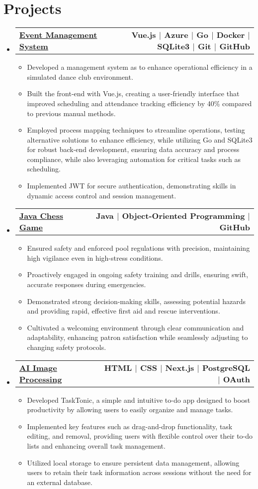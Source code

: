 \documentclass[letterpaper,10pt]{article}
\makeatletter
\newcommand{\resumeItem}[1]{
  \item\small{
    {#1 \vspace{-2pt}}
  }
}
\newcommand{\resumeProjectHeading}[2]{
    \item
    \begin{tabular*}{1.00\textwidth}{l@{\extracolsep{\fill}}r}
      \small#1 & #2 \\
    \end{tabular*}\vspace{-7pt}
    
}
\newcommand{\resumeSubHeadingListStart}{\begin{itemize}[leftmargin=0.0in, label={}]}
\newcommand{\resumeSubHeadingListEnd}{\end{itemize} \vspace{-18pt}}
\newcommand{\resumeItemListStart}{\begin{itemize}}
\newcommand{\resumeItemListEnd}{\end{itemize}\vspace{-4pt}}
\makeatother
\begin{document}
\section{Projects}
    \resumeSubHeadingListStart
      \vspace{-3pt}
      \resumeProjectHeading
        {
        \textbf{\href{https://github.com/Kyoko522/Dance-Club-Management-App}
        {Event Management System}}
        }{\textbf{Vue.js $|$ Azure $|$ Go $|$ Docker $|$ SQLite3 $|$ Git $|$ GitHub}}
        \resumeItemListStart
            \resumeItem{Developed a management system as to enhance operational efficiency in a simulated dance club environment.}
            \resumeItem{Built the front-end with Vue.js, creating a user-friendly interface that improved scheduling and attendance tracking efficiency by 40\% compared to previous manual methods.}
            \resumeItem{Employed process mapping techniques to streamline operations, testing alternative solutions to enhance efficiency, while utilizing Go and SQLite3 for robust back-end development, ensuring data accuracy and process compliance, while also leveraging automation for critical tasks such as scheduling.}
            \resumeItem{Implemented JWT for secure authentication, demonstrating skills in dynamic access control and session management.}
          \resumeItemListEnd
      \vspace{-7pt}
      \resumeProjectHeading
        {
        \textbf{\href{https://github.com/Kyoko522/Chess}{Java Chess Game}}
        }{\textbf{Java $|$ Object-Oriented Programming $|$ GitHub}}
        \resumeItemListStart
            \resumeItem{Ensured safety and enforced pool regulations with precision, maintaining high vigilance even in high-stress conditions.}
        \resumeItem{Proactively engaged in ongoing safety training and drills, ensuring swift, accurate responses during emergencies.}
        \resumeItem{Demonstrated strong decision-making skills, assessing potential hazards and providing rapid, effective first aid and rescue interventions.}
        \resumeItem{Cultivated a welcoming environment through clear communication and adaptability, enhancing patron satisfaction while seamlessly adjusting to changing safety protocols.}
        \resumeItemListEnd
      \vspace{-7pt}
      \resumeProjectHeading
          {
          \textbf{\href{https://tasktonic.netlify.app/}{{AI Image Processing}}}
          }{\textbf{HTML $|$ CSS $|$ Next.js $|$ PostgreSQL $|$ OAuth}}
          \resumeItemListStart
            \resumeItem{Developed TaskTonic, a simple and intuitive to-do app designed to boost productivity by allowing users to easily organize and manage tasks.}
            \resumeItem{Implemented key features such as drag-and-drop functionality, task editing, and removal, providing users with flexible control over their to-do lists and enhancing overall task management.}
            \resumeItem{Utilized local storage to ensure persistent data management, allowing users to retain their task information across sessions without the need for an external database.}
          \resumeItemListEnd
      \vspace{-3pt}
    \resumeSubHeadingListEnd
%
\end{document}
